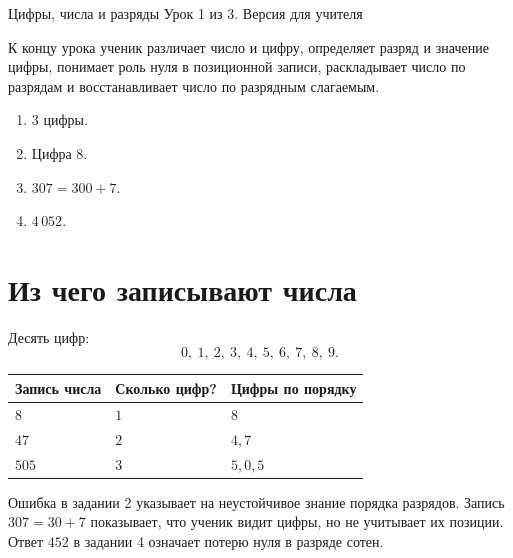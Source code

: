 
\worksheettitle
  {Цифры, числа и разряды}
  {Урок 1 из 3. Версия для учителя}

\begin{teacherbox}
  К концу урока ученик различает число и цифру, определяет разряд и значение
  цифры, понимает роль нуля в позиционной записи, раскладывает число по
  разрядам и восстанавливает число по разрядным слагаемым.
\end{teacherbox}

\begin{checkpointbox}
  \begin{enumerate}[label=\textbf{\arabic*.},itemsep=0.35em]
    \item \(3\) цифры.
    \item Цифра \(8\).
    \item \(307=300+7\).
    \item \(4\,052\).
  \end{enumerate}
\end{checkpointbox}

\section{Из чего записывают числа}

Десять цифр:
\[
  0,\ 1,\ 2,\ 3,\ 4,\ 5,\ 6,\ 7,\ 8,\ 9.
\]

\begin{fillbox}
  \begin{center}
    \renewcommand{\arraystretch}{1.45}
    \begin{tabularx}{0.92\textwidth}{@{}>{\centering\arraybackslash}p{}>{\centering\arraybackslash}p{}X@{}}
      \toprule
      \rowcolor{TableHeader}
      Запись числа & Сколько цифр? & Цифры по порядку \\
      \midrule
      \(8\) & \(1\) & \(8\) \\
      \(47\) & \(2\) & \(4,7\) \\
      \(505\) & \(3\) & \(5,0,5\) \\
      \bottomrule
    \end{tabularx}
  \end{center}
\end{fillbox}

\begin{teacherbox}
  Ошибка в задании 2 указывает на неустойчивое знание порядка разрядов.
  Запись \(307=30+7\) показывает, что ученик видит цифры, но не учитывает
  их позиции. Ответ \(452\) в задании 4 означает потерю нуля в разряде сотен.
\end{teacherbox}


